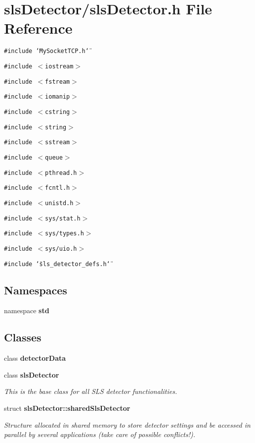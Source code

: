 \section{sls\-Detector/sls\-Detector.h File Reference}
\label{slsDetector_8h}
{\tt \#include \char`\"{}My\-Socket\-TCP.h\char`\"{}}\par
{\tt \#include $<$iostream$>$}\par
{\tt \#include $<$fstream$>$}\par
{\tt \#include $<$iomanip$>$}\par
{\tt \#include $<$cstring$>$}\par
{\tt \#include $<$string$>$}\par
{\tt \#include $<$sstream$>$}\par
{\tt \#include $<$queue$>$}\par
{\tt \#include $<$pthread.h$>$}\par
{\tt \#include $<$fcntl.h$>$}\par
{\tt \#include $<$unistd.h$>$}\par
{\tt \#include $<$sys/stat.h$>$}\par
{\tt \#include $<$sys/types.h$>$}\par
{\tt \#include $<$sys/uio.h$>$}\par
{\tt \#include \char`\"{}sls\_\-detector\_\-defs.h\char`\"{}}\par
\subsection*{Namespaces}
\begin{CompactItemize}
\item 
namespace \bf{std}
\end{CompactItemize}
\subsection*{Classes}
\begin{CompactItemize}
\item 
class \bf{detector\-Data}
\item 
class \bf{sls\-Detector}
\begin{CompactList}\small\item\em This is the base class for all SLS detector functionalities. \item\end{CompactList}\item 
struct \bf{sls\-Detector::shared\-Sls\-Detector}
\begin{CompactList}\small\item\em Structure allocated in shared memory to store detector settings and be accessed in parallel by several applications (take care of possible conflicts!). \item\end{CompactList}\end{CompactItemize}
